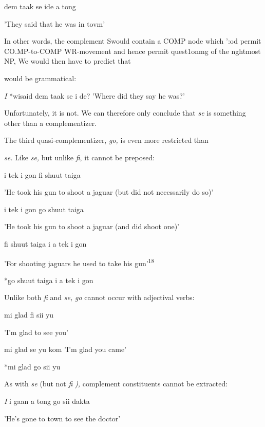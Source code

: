 \ea\label{ex:208}
 dem taak se ide a tong
\glt
\z

'They said that he was in tovm'

In other words, the complement Swould contain a COMP node which ':od permit CO.MP-to-COMP WR-movement and hence permit ques\-t1onmg of the nghtmost NP, We would then have to predict that

 would be grammatical:
  


 


\ea\label{ex:209}
 \textit{I} *wisaid dem taak se i de? 'Where did they say he was?'
\glt
\z


Unfortunately, it is not. We can therefore only conclude that \textit{se }is something other than a complementizer.

The third quasi-complementizer, \textit{go,} is even more restricted than

\textit{se.} Like \textit{se,} but unlike \textit{fi}, it cannot be preposed:

\ea\label{ex:210}
 i tek i gon fi shuut taiga
\glt
\z

'He took his gun to shoot a jaguar (but did not necessarily do so)'

\ea\label{ex:211}
 i tek i gon go shuut taiga
\glt
\z

'He took his gun to shoot a jaguar (and did shoot one)'

\ea\label{ex:212}
 fi shuut taiga i a tek i gon
\glt
\z

'For shooting jaguars he used to take his gun'\textsuperscript{1}\textsuperscript{8}

\ea\label{ex:213}
 *go shuut taiga i a tek i gon
\glt
\z

Unlike both \textit{fi }and \textit{se,} \textit{go} cannot occur with adjectival verbs:

\ea\label{ex:214}
 mi glad fi sii yu
\glt
\z

'I'm glad to see you'

\ea\label{ex:215}
 mi glad se yu kom 'I'm glad you came'
\glt
\z

\ea\label{ex:216}
 *mi glad go sii yu
\glt
\z

As with \textit{se }(but not \textit{fi} \textit{),} complement constituents cannot be extracted:

\ea\label{ex:217}
\textit{I} i gaan a tong go sii dakta
\glt
\z

'He's gone to town to see the doctor'


